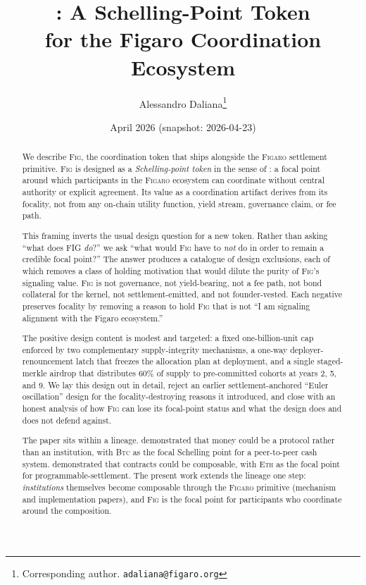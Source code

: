 \documentclass[11pt,a4paper]{article}
\title{%
  \fig{}: A Schelling-Point Token\\
  for the Figaro Coordination Ecosystem%
}
\author{
  Alessandro Daliana\thanks{Corresponding author. \texttt{adaliana@figaro.org}}
}
\date{April 2026 (snapshot: 2026-04-23)}
\theoremstyle{definition}
\theoremstyle{remark}
\newcommand{\figaro}{\textsc{Figaro}}
\newcommand{\fig}{\textsc{Fig}}
\begin{document}
\maketitle

\begin{abstract}
We describe \fig, the coordination token that ships alongside the
\figaro{} settlement primitive. \fig{} is designed as a
\emph{Schelling-point token} in the sense of
\citet{schelling1960strategy}: a focal point around which
participants in the \figaro{} ecosystem can coordinate without
central authority or explicit agreement. Its value as a
coordination artifact derives from its focality, not from any
on-chain utility function, yield stream, governance claim, or fee
path.

This framing inverts the usual design question for a new token.
Rather than asking ``what does FIG \emph{do}?'' we ask ``what
would \fig{} have to \emph{not} do in order to remain a credible
focal point?'' The answer produces a catalogue of design
exclusions, each of which removes a class of holding motivation
that would dilute the purity of \fig{}'s signaling value. \fig{}
is not governance, not yield-bearing, not a fee path, not bond
collateral for the kernel, not settlement-emitted, and not
founder-vested. Each negative preserves focality by removing a
reason to hold \fig{} that is not ``I am signaling alignment with
the Figaro ecosystem.''

The positive design content is modest and targeted: a fixed
one-billion-unit cap enforced by two complementary supply-integrity
mechanisms, a one-way deployer-renouncement latch that freezes the
allocation plan at deployment, and a single staged-merkle airdrop
that distributes 60\% of supply to pre-committed cohorts at years
2, 5, and 9. We lay this design out in detail, reject an earlier
settlement-anchored ``Euler oscillation'' design for the
focality-destroying reasons it introduced, and close with an
honest analysis of how \fig{} can lose its focal-point status and
what the design does and does not defend against.

The paper sits within a lineage. \citet{nakamoto2008bitcoin}
demonstrated that money could be a protocol rather than an
institution, with \textsc{Btc} as the focal Schelling point for a
peer-to-peer cash system. \citet{buterin2014ethereum} demonstrated
that contracts could be composable, with \textsc{Eth} as the focal
point for programmable-settlement. The present work extends the
lineage one step: \emph{institutions} themselves become composable
through the \figaro{}
primitive (mechanism and implementation papers), and
\fig{} is the focal point for participants who coordinate around
the composition.
\end{abstract}
\end{document}
